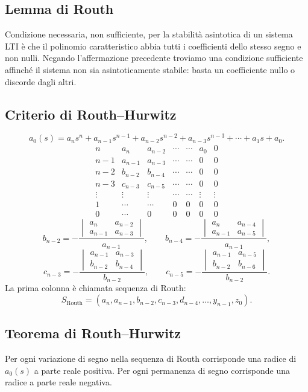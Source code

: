 \subsection*{Lemma di Routh}
Condizione necessaria, non sufficiente, per la stabilità asintotica di un sistema LTI è che il polinomio caratteristico abbia tutti i coefficienti dello stesso segno e non nulli.
Negando l'affermazione precedente troviamo una condizione sufficiente affinché il sistema non sia asintoticamente stabile: basta un coefficiente nullo o discorde dagli altri.
\subsection*{Criterio di Routh--Hurwitz}
\[
a_0(s)=a_ns^n+a_{n-1}s^{n-1}+a_{n-2}s^{n-2}+a_{n-3}s^{n-3}+\cdots+a_1s+a_0.
\]
\[
\begin{array}{c|cccccc}
n&a_n&a_{n-2}&\cdots&\cdots&a_0&0\\
n-1&a_{n-1}&a_{n-3}&\cdots&\cdots&0&0\\
n-2&b_{n-2}&b_{n-4}&\cdots&\cdots&0&0\\
n-3&c_{n-3}&c_{n-5}&\cdots&\cdots&0&0\\
\vdots&\vdots&\vdots&\cdots&\cdots&\vdots&\vdots\\
1&\cdots&\cdots&0&0&0&0\\
0&\cdots&0&0&0&0&0
\end{array}
\]
\[
b_{n-2}=-\frac{\begin{vmatrix}a_n&a_{n-2}\\a_{n-1}&a_{n-3}\end{vmatrix}}{a_{n-1}},
\qquad b_{n-4}=-\frac{\begin{vmatrix}a_n&a_{n-4}\\a_{n-1}&a_{n-5}\end{vmatrix}}{a_{n-1}},
\]
\[
c_{n-3}=-\frac{\begin{vmatrix}a_{n-1}&a_{n-3}\\b_{n-2}&b_{n-4}\end{vmatrix}}{b_{n-2}},
\qquad c_{n-5}=-\frac{\begin{vmatrix}a_{n-1}&a_{n-5}\\b_{n-2}&b_{n-6}\end{vmatrix}}{b_{n-2}}.
\]
La prima colonna è chiamata sequenza di Routh:
\[
S_{\mathrm{Routh}}=(a_n,a_{n-1},b_{n-2},c_{n-3},d_{n-4},\ldots,y_{n-1},z_0).
\]
\subsection*{Teorema di Routh--Hurwitz}
Per ogni variazione di segno nella sequenza di Routh corrisponde una radice di $a_0(s)$ a parte reale positiva.
Per ogni permanenza di segno corrisponde una radice a parte reale negativa.
